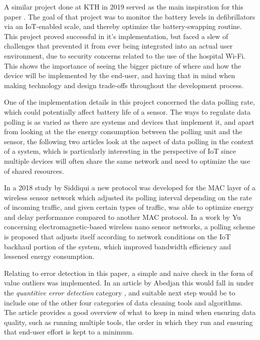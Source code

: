 A similar project done at KTH in 2019 served as the main inspiration for this paper \cite{hospital}. The goal of that project was to monitor the battery levels in defibrillators via an IoT-enabled scale, and thereby optimize the battery-swapping routine. This project proved successful in it's implementation, but faced a slew of challenges that prevented it from ever being integrated into an actual user environment, due to security concerns related to the use of the hospital Wi-Fi. This shows the importance of seeing the bigger picture of where and how the device will be implemented by the end-user, and having that in mind when making technology and design trade-offs throughout the development process.

One of the implementation details in this project concerned the data polling rate, which could potentially affect battery life of a sensor. The ways to regulate data polling is as varied as there are systems and devices that implement it, and apart from looking at the the energy consumption between the polling unit and the sensor, the following two articles look at the aspect of data polling in the context of a system, which is particularly interesting in the perspective of IoT since multiple devices will often share the same network and need to optimize the use of shared resources.

In a 2018 study by Siddiqui \etal \cite{ADP-MAC} a new protocol was developed for the MAC layer of a wireless sensor network which adjusted its polling interval depending on the rate of incoming traffic, and given certain types of traffic, was able to optimize energy and delay performance compared to another MAC protocol. 
In a work by Yu \etal \cite{nanonetworks} concerning electromagnetic-based wireless nano sensor networks, a polling scheme is proposed that adjusts itself according to network conditions on the IoT backhaul portion of the system, which improved bandwidth efficiency and lessened energy consumption. 

Relating to error detection in this paper, a simple and naive check in the form of value outliers was implemented. In an article by Abedjan \etal this would fall in under the \textit{quantitive error detection} category \cite{data-errors}, and suitable next step would be to include one of the other four categories of data cleaning tools and algorithms. The article provides a good overview of what to keep in mind when ensuring data quality, such as running multiple tools, the order in which they run and ensuring that end-user effort is kept to a minimum.